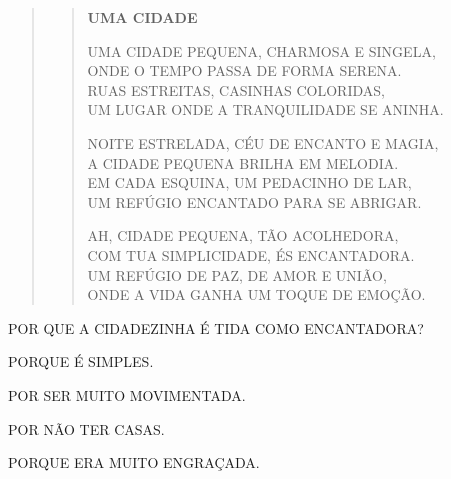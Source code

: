 \begin{quote}
\begin{verse}
\textbf{UMA CIDADE}

UMA CIDADE PEQUENA, CHARMOSA E SINGELA,\\
ONDE O TEMPO PASSA DE FORMA SERENA.\\
RUAS ESTREITAS, CASINHAS COLORIDAS,\\
UM LUGAR ONDE A TRANQUILIDADE SE ANINHA.


NOITE ESTRELADA, CÉU DE ENCANTO E MAGIA,\\
A CIDADE PEQUENA BRILHA EM MELODIA.\\
EM CADA ESQUINA, UM PEDACINHO DE LAR,\\
UM REFÚGIO ENCANTADO PARA SE ABRIGAR.


AH, CIDADE PEQUENA, TÃO ACOLHEDORA,\\
COM TUA SIMPLICIDADE, ÉS ENCANTADORA.\\
UM REFÚGIO DE PAZ, DE AMOR E UNIÃO,\\
ONDE A VIDA GANHA UM TOQUE DE EMOÇÃO.
\end{verse}

\end{quote}

POR QUE A CIDADEZINHA É TIDA COMO ENCANTADORA?

\begin{escolha}
\item PORQUE É SIMPLES.

\item POR SER MUITO MOVIMENTADA.

\item POR NÃO TER CASAS.

\item PORQUE ERA MUITO ENGRAÇADA.
\end{escolha}

